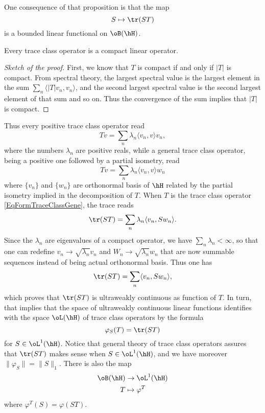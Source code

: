 One consequence of that proposition is that the map
\begin{equation}
	S\mapsto \tr(ST)
\end{equation}
is a bounded linear functional on $\oB(\hH)$.

\begin{proposition}
Every trace class operator is a compact linear operator.
\end{proposition}

\begin{proof}[Sketch of the proof]
First, we know that $T$ is compact if and only if $| T |$ is compact. From spectral theory, the largest spectral value is the largest element in the sum $\sum_n\langle | T |v_n, v_n\rangle $, and the second largest spectral value is the second largest element of that sum and so on. Thus the convergence of the sum implies that $| T |$ is compact.
\end{proof}

Thus every positive trace class operator read
\begin{equation}
	Tv=\sum_n\lambda_n\langle v_n, v\rangle v_n,
\end{equation}
where the numbers $\lambda_n$ are positive reals, while a general trace class operator, being a positive one followed by a partial isometry, read
\begin{equation}		\label{EqFormTraceClassGene}
	Tv=\sum_n\lambda_n\langle v_n, v\rangle w_n
\end{equation}
where $\{ v_n \}$ and $\{ w_n \}$ are orthonormal basis of $\hH$ related by the partial isometry implied in the decomposition of $T$. When $T$ is the trace class operator \eqref{EqFormTraceClassGene}, the trace reads
\begin{equation}
	\tr(ST)=\sum_n\lambda_n\langle v_n, Sw_n\rangle .
\end{equation}
Since the $\lambda_n$ are eigenvalues of a compact operator, we have $\sum_n\lambda_n<\infty$, so that one can redefine $v_n\to \sqrt{\lambda_n}v_n$ and $W_n\to \sqrt{\lambda_n}w_n$ that are now summable sequences instead of being actual orthonormal basis. Thus one has
\begin{equation}
	\tr(ST)=\sum_n\langle v_n, Sw_n\rangle ,
\end{equation}
which proves that $\tr(ST)$ is ultraweakly continuous as function of $T$. In turn, that implies that the space of ultraweakly continuous linear functions identifies with the space $\oL(\hH)$ of trace class operators by the formula
\begin{equation}
	\varphi_S(T)=\tr(ST)
\end{equation}
for $S\in\oL^1(\hH)$. Notice that general theory of trace class operators assures that $\tr(ST)$ makes sense when $S\in\oL^1(\hH)$, and we have moreover $\| \varphi_S \|=\| S \|_1$. There is also the map
\begin{equation}
\begin{aligned}
 \oB(\hH)&\to \oL^1(\hH) \\
   T&\mapsto \varphi^T
\end{aligned}
\end{equation}
where $\varphi^T(S)=\varphi(ST)$.

